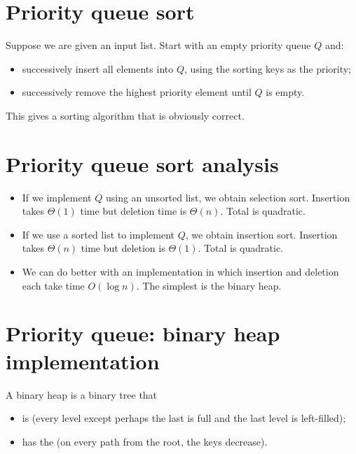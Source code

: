 \section{Priority queue sort}

Suppose we are given an input list. Start with an empty priority queue $Q$
and:
\begin{itemize}
\item successively insert all elements into $Q$, using the sorting keys as the 
priority;
\item successively remove the highest priority element until $Q$ is empty. 
\end{itemize}


This gives a sorting algorithm that is obviously correct. 

\section{Priority queue sort analysis}
\begin{itemize}
\item If we implement $Q$ using an unsorted list, we obtain selection sort. 
Insertion takes $\Theta(1)$ time but deletion time is $\Theta(n)$. Total is quadratic.
\item If we use a sorted list to implement $Q$, we obtain insertion sort. 
Insertion takes $\Theta(n)$ time but deletion is $\Theta(1)$. Total is quadratic.
\item We can do better with an implementation in which insertion and deletion 
each take time $O(\log n)$. The simplest is the {binary heap}.
\end{itemize}

\section{Priority queue: binary heap implementation}
\begin{Definition}
A {binary heap} is a binary tree that 
\begin{itemize}
\item is  (every level except perhaps the last is full and 
the last level is left-filled);
\item has the  (on every path from the root, the keys decrease). 
\end{itemize}
\end{Definition}

